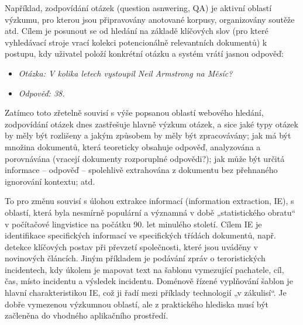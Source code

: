 \begin{multicols}{2}
Například, zodpovídání otázek (question asnwering, QA) je aktivní oblastí výzkumu, pro kterou jsou připravovány anotované korpusy, organizovány soutěže atd. Cílem je posunout se od hledání na základě klíčových slov (pro které vyhledávací stroje vrací kolekci potencionálně relevantních dokumentů) k postupu, kdy uživatel položí konkrétní otázku a systém vrátí jasnou odpověď:
\begin{itemize}
\item[] \textit{Otázka: V kolika letech vystoupil Neil Armstrong na Měsíc?}
\item[] \textit{Odpověď: 38.}
\end{itemize}
Zatímco toto zřetelně souvisí s výše popsanou oblastí webového hledání, zodpovídání otázek dnes zastřešuje hlavně výzkum otázek, a sice jaké typy otázek by měly být rozlišeny a jakým způsobem by měly být zpracovávány; jak má být množina dokumentů, která teoreticky obsahuje odpověď, analyzována a porovnávána (vracejí dokumenty rozporuplné odpovědi?); jak může být určitá informace -- odpověď -- spolehlivě extrahována z dokumentu bez přehnaného ignorování kontextu; atd.

To pro změnu souvisí s úlohou extrakce informací (information extraction, IE), s oblastí, která byla nesmírně populární a významná v době „statistického obratu“ v počítačové lingvistice na počátku 90. let minulého století. Cílem IE je identifikace specifických informací ve specifických třídách dokumentů, např. detekce klíčových postav při převzetí společnosti, které jsou uváděny v novinových článcích. Jiným příkladem je podávání zpráv o teroristických incidentech, kdy úkolem je mapovat text na šablonu vymezující pachatele, cíl, čas, místo incidentu a výsledek incidentu. Doménově řízené vyplňování šablon je hlavní charakteristikou IE, což ji řadí mezi příklady technologií „v zákulisí“. Je dobře vymezenou výzkumnou oblastí, ale z praktického hlediska musí být začleněna do vhodného aplikačního prostředí.



\end{multicols}
